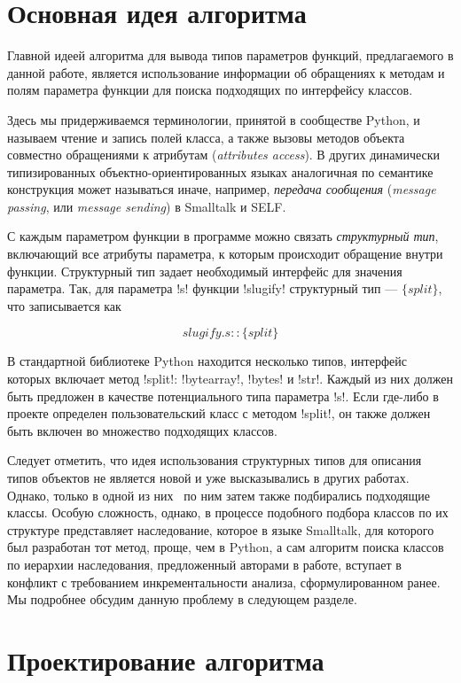 \section{Основная идея алгоритма}
\label{sec:main-idea}

Главной идеей алгоритма для вывода типов параметров функций, предлагаемого в
данной работе, является использование информации об обращениях к методам и полям
параметра функции для поиска подходящих по интерфейсу классов. 

Здесь мы придерживаемся терминологии, принятой в сообществе Python, и называем
чтение и запись полей класса, а также вызовы методов объекта совместно
обращениями к атрибутам (\emph{attributes access}). В других динамически
типизированных объектно-ориентированных языках аналогичная по семантике
конструкция может называться иначе, например, \emph{передача сообщения}
(\emph{message passing}, или \emph{message sending}) в Smalltalk и SELF.

С каждым параметром функции в программе можно связать \emph{структурный тип},
включающий все атрибуты параметра, к которым происходит обращение внутри
функции. Структурный тип задает необходимый интерфейс для значения параметра.
Так, для параметра !s! функции !slugify! структурный тип --- $\{split\}$, что
записывается как 

\[
    slugify.s :: \{ split \}
\]

В стандартной библиотеке Python находится несколько типов, интерфейс которых
включает метод !split!: !bytearray!, !bytes! и !str!. Каждый из
них должен быть предложен в качестве потенциального типа параметра !s!. Если
где-либо в проекте определен пользовательский класс с методом !split!, он также
должен быть включен во множество подходящих классов.

Следует отметить, что идея использования структурных типов для описания типов
объектов не является новой и уже высказывались в других работах.  Однако, только
в одной из них~\cite{Pluquet2009} по ним затем также подбирались подходящие
классы. Особую сложность, однако, в процессе подобного подбора классов по их
структуре представляет наследование, которое в языке Smalltalk, для которого был
разработан тот метод, проще, чем в Python, а сам алгоритм поиска классов по
иерархии наследования, предложенный авторами в работе, вступает в конфликт с
требованием инкрементальности анализа, сформулированном ранее. Мы подробнее
обсудим данную проблему в следующем разделе.

\section{Проектирование алгоритма}
\label{sec:algorithm-design}

